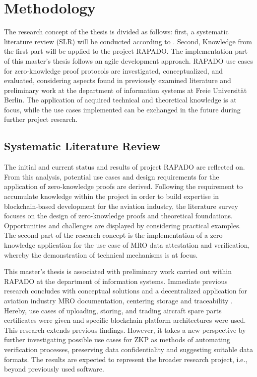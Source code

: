 \chapter{Methodology}
The research concept of the thesis is divided as follows: first, a systematic literature review (SLR) will be conducted according to \cite{HevnerAR2004DSiI, vomBrockeJan2019TDgs, Webster2002AnalyzingTP}. Second, Knowledge from the first part will be applied to the project RAPADO. The implementation part of this master's thesis follows an agile development approach. RAPADO use cases for zero-knowledge proof protocols are investigated, conceptualized, and evaluated, considering aspects found in previously examined literature and preliminary work at the department of information systems at Freie Universit{\"a}t Berlin. The application of acquired technical and theoretical knowledge is at focus, while the use cases implemented can be exchanged in the future during further project research. 

\section{Systematic Literature Review}
The initial and current status and results of project RAPADO are reflected on. From this analysis, potential use cases and design requirements for the application of zero-knowledge proofs are derived. Following the requirement to accumulate knowledge within the project in order to build expertise in blockchain-based development for the aviation industry, the literature survey focuses on the design of zero-knowledge proofs and theoretical foundations. Opportunities and challenges are displayed by considering practical examples. The second part of the research concept is the implementation of a zero-knowledge application for the use case of MRO data attestation and verification, whereby the demonstration of technical mechanisms is at focus.

This master's thesis is associated with preliminary work carried out within RAPADO at the department of information systems. Immediate previous research concludes with conceptual solutions and a decentralized application for aviation industry MRO documentation, centering storage and traceability \citep{ZedelJ}. Hereby, use cases of uploading, storing, and trading aircraft spare parts certificates were given and specific blockchain platform architectures were used. This research extends previous findings. However, it takes a new perspective by further investigating possible use cases for ZKP as methods of automating verification processes, preserving data confidentiality and suggesting suitable data formats. The results are expected to represent the broader research project, i.e., beyond previously used software.

